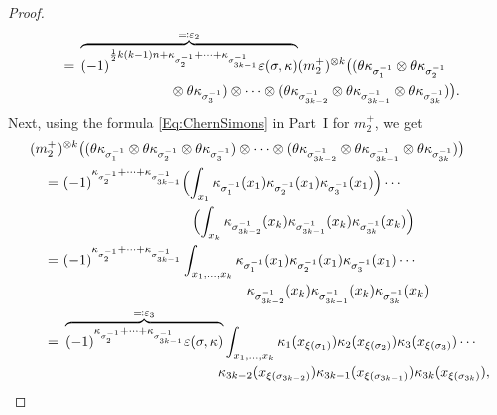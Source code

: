 \documentclass[\MainFolder/Text.tex]{subfiles}
\begin{document}
\begin{proof}
\begin{align*}
 &\quad = \begin{multlined}[t]\overbrace{(-1)^{\frac{1}{2} k(k-1) n  + \kappa_{\sigma^{-1}_{2}} + \dotsb + \kappa_{\sigma^{-1}_{3k-1}}} \varepsilon(\sigma,\kappa)}^{\eqqcolon\varepsilon_2} (m_2^+)^{\otimes k} \bigl((\SuspU \kappa_{\sigma^{-1}_1} \otimes \SuspU \kappa_{\sigma^{-1}_2} \\ \otimes \SuspU \kappa_{\sigma^{-1}_3}) \otimes \dotsb \otimes (\SuspU \kappa_{\sigma^{-1}_{3k-2}} \otimes \SuspU \kappa_{\sigma^{-1}_{3k-1}} \otimes \SuspU \kappa_{\sigma^{-1}_{3k}})\bigr). \end{multlined}
\end{align*}
Next, using the formula \eqref{Eq:ChernSimons} in Part~I for $m_2^+$, we get
\begin{align*}
&(m_2^+)^{\otimes k}\bigl((\SuspU \kappa_{\sigma^{-1}_{1}} \otimes \SuspU \kappa_{\sigma^{-1}_{2}} \otimes \SuspU \kappa_{\sigma^{-1}_{3}}) \otimes \dotsb \otimes (\SuspU \kappa_{\sigma^{-1}_{3k-2}} \otimes \SuspU \kappa_{\sigma^{-1}_{3k-1}} \otimes \SuspU \kappa_{\sigma^{-1}_{3k}})\bigr) \\
&\quad= \begin{multlined}[t](-1)^{\kappa_{\sigma^{-1}_{2}} + \dotsb + \kappa_{\sigma^{-1}_{3k-1}}} \Bigl(\int_{x_1} \kappa_{\sigma^{-1}_{1}}(x_1)\kappa_{\sigma^{-1}_{2}}(x_1)\kappa_{\sigma^{-1}_{3}}(x_1) \Bigr) \dotsm \\ \Bigl(\int_{x_k} \kappa_{\sigma^{-1}_{3k-2}}(x_k)\kappa_{\sigma^{-1}_{3k-1}}(x_k) \kappa_{\sigma^{-1}_{3k}}(x_k) \Bigr)\end{multlined} \\
&\quad= \begin{multlined}[t](-1)^{\kappa_{\sigma^{-1}_{2}} + \dotsb + \kappa_{\sigma^{-1}_{3k-1}}} \int_{x_1,\dotsc,x_k} \kappa_{\sigma_{1}^{-1}}(x_1)\kappa_{\sigma_{2}^{-1}}(x_1)\kappa_{\sigma_{3}^{-1}}(x_1) \dotsm \\ \kappa_{\sigma_{3k-2}^{-1}}(x_k) \kappa_{\sigma_{3k-1}^{-1}}(x_k) \kappa_{\sigma_{3k}^{-1}}(x_k) \end{multlined}\\
&\quad = \begin{multlined}[t]\overbrace{(-1)^{\kappa_{\sigma^{-1}_{2}} + \dotsb + \kappa_{\sigma^{-1}_{3k-1}}} \varepsilon(\sigma,\kappa)}^{\eqqcolon\varepsilon_3} \int_{x_1,\dotsc,x_k} \kappa_{1}(x_{\xi(\sigma_{1})})\kappa_{2}(x_{\xi(\sigma_{2})}) \kappa_{3}(x_{\xi(\sigma_{3})}) \dotsm \\ \kappa_{3k-2}(x_{\xi(\sigma_{3k-2})}) \kappa_{3k-1}(x_{\xi(\sigma_{3k-1})})\kappa_{3k}(x_{\xi(\sigma_{3k})}), \end{multlined}

\end{align*}
\end{proof}
\end{document}
